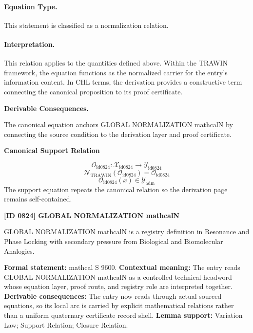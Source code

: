 \paragraph{Equation Type.}
This statement is classified as a normalization relation.

\paragraph{Interpretation.}
This relation applies to the quantities defined above. Within the TRAWIN framework, the equation functions as the normalized carrier for the entry’s information content. In CHL terms, the derivation provides a constructive term connecting the canonical proposition to its proof certificate.

\par\vspace{0.35em}
\noindent\textbf{Derivable Consequences.}\quad
\begingroup
\footnotesize
\raggedright
The canonical equation anchors GLOBAL NORMALIZATION mathcalN by connecting the source condition to the derivation layer and proof certificate.
\par\endgroup

\noindent\textbf{Canonical Support Relation}\par
\[
\mathcal{O}_{\mathrm{id0824}}:\mathcal{X}_{\mathrm{id0824}}\longrightarrow\mathcal{Y}_{\mathrm{id0824}}
\]
\[
\mathcal{N}_{\mathrm{TRAWIN}}(\mathcal{O}_{\mathrm{id0824}})=\mathcal{O}_{\mathrm{id0824}}
\]
\[
\mathcal{O}_{\mathrm{id0824}}(x)\in\mathcal{Y}_{\mathrm{adm}}
\]
\noindent The support equation repeats the canonical relation so the derivation page remains self-contained.\par

\clearpage
\noindent\textbf{[ID 0824] GLOBAL NORMALIZATION mathcalN}\par
\vspace{0.35em}
\begingroup\small
{}
GLOBAL NORMALIZATION mathcalN is a registry definition in Resonance and Phase Locking with secondary pressure from Biological and Biomolecular Analogies.

\begingroup\footnotesize\setlength{\emergencystretch}{3em}\sloppy
\textbf{Formal statement:} mathcal S 9600. \textbf{Contextual meaning:} The entry reads GLOBAL NORMALIZATION mathcalN as a controlled technical headword whose equation layer, proof route, and registry role are interpreted together. \textbf{Derivable consequences:} The entry now reads through actual sourced equations, so its local arc is carried by explicit mathematical relations rather than a uniform quaternary certificate record shell. \textbf{Lemma support:} Variation Law; Support Relation; Closure Relation.\par
\endgroup

